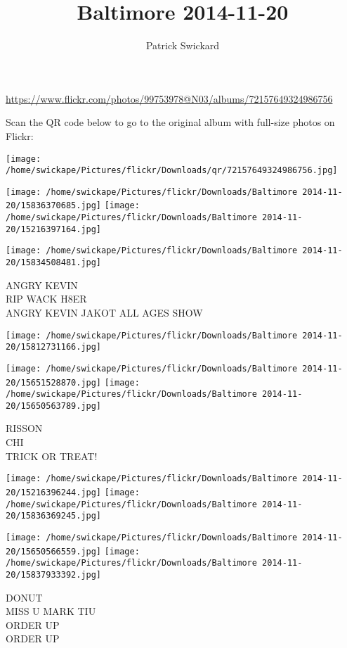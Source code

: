 \documentclass[10pt,letterpaper]{article}
\title{Baltimore 2014-11-20}
\author{Patrick Swickard}
\date{}
\begin{document}
\maketitle

\url{https://www.flickr.com/photos/99753978@N03/albums/72157649324986756}

Scan the QR code below to go to the original album with full-size photos on Flickr:

\texttt{[image: /home/swickape/Pictures/flickr/Downloads/qr/72157649324986756.jpg]}
\pagebreak

\texttt{[image: /home/swickape/Pictures/flickr/Downloads/Baltimore 2014-11-20/15836370685.jpg]}
\texttt{[image: /home/swickape/Pictures/flickr/Downloads/Baltimore 2014-11-20/15216397164.jpg]}

\texttt{[image: /home/swickape/Pictures/flickr/Downloads/Baltimore 2014-11-20/15834508481.jpg]}

ANGRY KEVIN\\
RIP WACK H8ER\\
ANGRY KEVIN JAKOT ALL AGES SHOW
\pagebreak

\texttt{[image: /home/swickape/Pictures/flickr/Downloads/Baltimore 2014-11-20/15812731166.jpg]}

\vspace{0.25in}
\texttt{[image: /home/swickape/Pictures/flickr/Downloads/Baltimore 2014-11-20/15651528870.jpg]}
\texttt{[image: /home/swickape/Pictures/flickr/Downloads/Baltimore 2014-11-20/15650563789.jpg]}

RISSON\\
CHI\\
TRICK OR TREAT!
\pagebreak

\texttt{[image: /home/swickape/Pictures/flickr/Downloads/Baltimore 2014-11-20/15216396244.jpg]}
\texttt{[image: /home/swickape/Pictures/flickr/Downloads/Baltimore 2014-11-20/15836369245.jpg]}

\texttt{[image: /home/swickape/Pictures/flickr/Downloads/Baltimore 2014-11-20/15650566559.jpg]}
\texttt{[image: /home/swickape/Pictures/flickr/Downloads/Baltimore 2014-11-20/15837933392.jpg]}

DONUT\\
MISS U MARK TIU\\
ORDER UP\\
ORDER UP
\pagebreak
\end{document}

